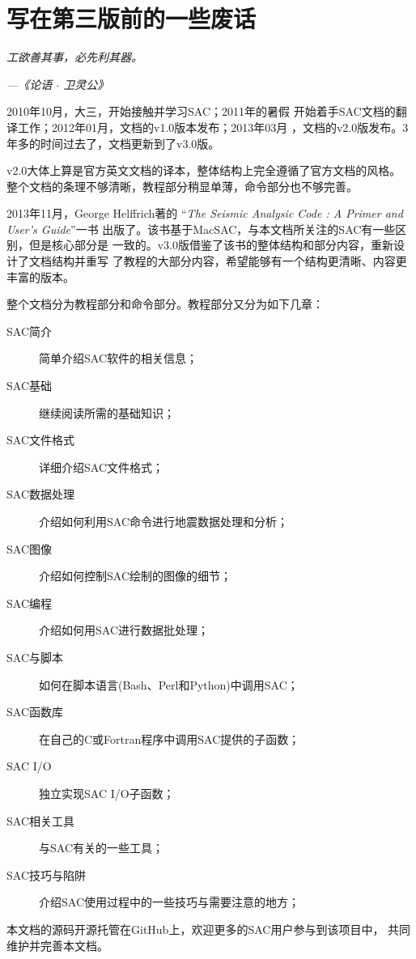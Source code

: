 {\section*{写在第三版前的一些废话}}

\begin{shadequote*}
\Large\emph{工欲善其事，必先利其器。}
\par\hfill\emph{\normalsize---《论语 $\cdot$ 卫灵公》}
\end{shadequote*}

2010年10月，大三，开始接触并学习SAC；2011年的暑假
开始着手SAC文档的翻译工作；2012年01月，文档的v1.0版本发布；2013年03月
，文档的v2.0版发布。3年多的时间过去了，文档更新到了v3.0版。

v2.0大体上算是官方英文文档的译本，整体结构上完全遵循了官方文档的风格。
整个文档的条理不够清晰，教程部分稍显单薄，命令部分也不够完善。

2013年11月，George Helffrich著的
``\emph{The Seismic Analysic Code : A Primer and User's Guide}''一书
出版了。该书基于MacSAC，与本文档所关注的SAC有一些区别，但是核心部分是
一致的。v3.0版借鉴了该书的整体结构和部分内容，重新设计了文档结构并重写
了教程的大部分内容，希望能够有一个结构更清晰、内容更丰富的版本。

整个文档分为教程部分和命令部分。教程部分又分为如下几章：
\begin{description}
\item[SAC简介] 简单介绍SAC软件的相关信息；
\item[SAC基础] 继续阅读所需的基础知识；
\item[SAC文件格式] 详细介绍SAC文件格式；
\item[SAC数据处理] 介绍如何利用SAC命令进行地震数据处理和分析；
\item[SAC图像] 介绍如何控制SAC绘制的图像的细节；
\item[SAC编程] 介绍如何用SAC进行数据批处理；
\item[SAC与脚本] 如何在脚本语言(Bash、Perl和Python)中调用SAC；
\item[SAC函数库] 在自己的C或Fortran程序中调用SAC提供的子函数；
\item[SAC I/O] 独立实现SAC I/O子函数；
\item[SAC相关工具] 与SAC有关的一些工具；
\item[SAC技巧与陷阱] 介绍SAC使用过程中的一些技巧与需要注意的地方；
\end{description}

本文档的源码开源托管在GitHub上，欢迎更多的SAC用户参与到该项目中，
共同维护并完善本文档。

